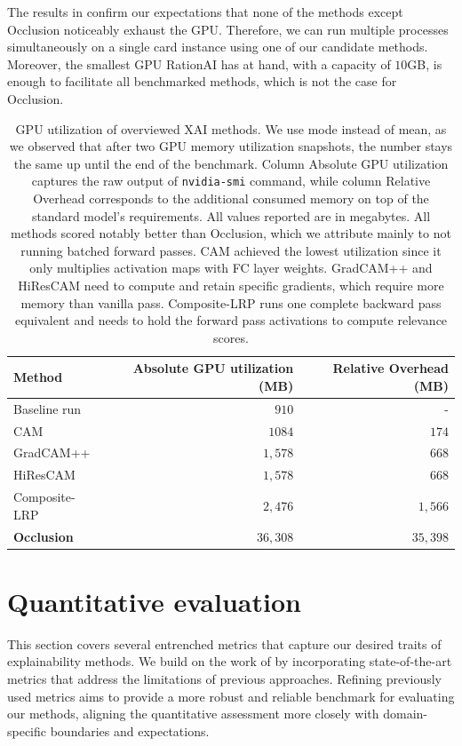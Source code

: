 The results in  confirm our expectations that none of the methods except Occlusion noticeably exhaust the GPU.
Therefore, we can run multiple processes simultaneously on a single card instance using one of our candidate methods.
Moreover, the smallest GPU RationAI has at hand, with a capacity of $10$GB, is enough to facilitate all benchmarked methods, which is not the case for Occlusion.
\begin{table}
\centering
{}
\begin{tabular}{@{} l r r @{}}\toprule
Method & Absolute GPU utilization (MB) & Relative Overhead (MB) \\ 
\midrule
Baseline run       & $910$      & -       \\
CAM                & $1084$     & $174$   \\
GradCAM++          & $1,578$     & $668$   \\
HiResCAM           & $1,578$     & $668$   \\
Composite-LRP      & $2,476$     & $1,566$  \\
\textbf{Occlusion} & $36,308$    & $35,398$ \\
\bottomrule
\end{tabular}
\caption{
GPU utilization of overviewed XAI methods. We use mode instead of mean, as we observed that after two GPU memory utilization snapshots, the number stays the same up until the end of the benchmark. Column Absolute GPU utilization captures the raw output of \texttt{nvidia-smi} command, while column Relative Overhead corresponds to the additional consumed memory on top of the standard model's requirements. All values reported are in megabytes. All methods scored notably better than Occlusion, which we attribute mainly to not running batched forward passes. CAM achieved the lowest utilization since it only multiplies activation maps with FC layer weights. GradCAM++ and HiResCAM need to compute and retain specific gradients, which require more memory than vanilla pass. Composite-LRP runs one complete backward pass equivalent and needs to hold the forward pass activations to compute relevance scores.
}
\label{tab:gpu-util}
\end{table}


\section{Quantitative evaluation}\label{sec:quant}

This section covers several entrenched metrics that capture our desired traits of explainability methods.
We build on the work of \cite{gallo} by incorporating state-of-the-art metrics that address the limitations of previous approaches.
Refining previously used metrics aims to provide a more robust and reliable benchmark for evaluating our methods, aligning the quantitative assessment more closely with domain-specific boundaries and expectations.

